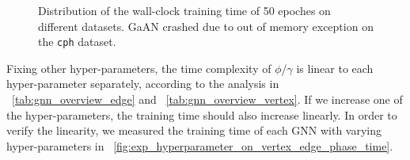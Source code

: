 \begin{figure}
    \caption{Distribution of the wall-clock training time of 50 epoches on different datasets. GaAN crashed due to out of memory exception on the \texttt{cph} dataset.}
    \label{fig:exp_absolute_training_time}
\end{figure}

Fixing other hyper-parameters, the time complexity of $\phi$/$\gamma$ is linear to each hyper-parameter separately, according to the analysis in \tablename~\ref{tab:gnn_overview_edge} and \tablename~\ref{tab:gnn_overview_vertex}.
If we increase one of the hyper-parameters, the training time should also increase linearly.
In order to verify the linearity, we measured the training time of each GNN with varying hyper-parameters in \figurename~\ref{fig:exp_hyperparameter_on_vertex_edge_phase_time}.

